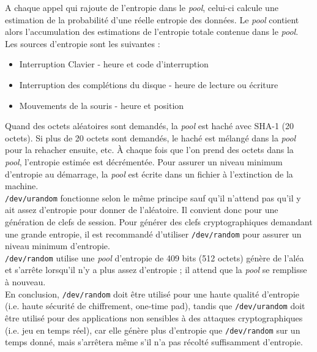 			A chaque appel qui rajoute de l'entropie dans le \textit{pool}, celui-ci calcule une estimation de la probabilité d'une réelle entropie des données. Le \textit{pool} contient alors l'accumulation des estimations de l'entropie totale contenue dans le \textit{pool}.\\
						
			Les sources d'entropie sont les suivantes :
			\begin{itemize}
			\item Interruption Clavier - heure et code d'interruption 
			\item Interruption des complétions du disque - heure de lecture ou écriture
			\item Mouvements de la souris - heure et position\\
			\end{itemize}
			
			Quand des octets aléatoires sont demandés, la \textit{pool} est haché avec SHA-1 (20 octets). Si plus de 20 octets sont demandés, le haché est mélangé dans la \textit{pool} pour la rehacher ensuite, etc. À chaque fois que l'on prend des octets dans la \textit{pool}, l'entropie estimée est décrémentée. Pour assurer un niveau minimum d'entropie au démarrage, la \textit{pool} est écrite dans un fichier à l'extinction de la machine.\\
			
			\texttt{/dev/urandom} fonctionne selon le même principe sauf qu'il n'attend pas qu'il y ait assez d'entropie pour donner de l'aléatoire. Il convient donc pour une génération de clefs de session. Pour générer des clefs cryptographiques demandant une grande entropie, il est recommandé d'utiliser \texttt{/dev/random} pour assurer un niveau minimum d'entropie.\\
			
			\texttt{/dev/random} utilise une \textit{pool} d'entropie de 409 bits (512 octets) génère de l'aléa et s'arrête lorsqu'il n'y a plus assez d'entropie ; il attend que la \textit{pool} se remplisse à nouveau.\\
			
			En conclusion, \texttt{/dev/random} doit être utilisé pour une haute qualité d'entropie (i.e. haute sécurité de chiffrement, one-time pad), tandis que \texttt{/dev/urandom} doit être utilisé pour des applications non sensibles à des attaques cryptographiques (i.e. jeu en temps réel), car elle génère plus d'entropie que \texttt{/dev/random} sur un temps donné, mais s'arrêtera même s'il n'a pas récolté suffisamment d'entropie.\\

